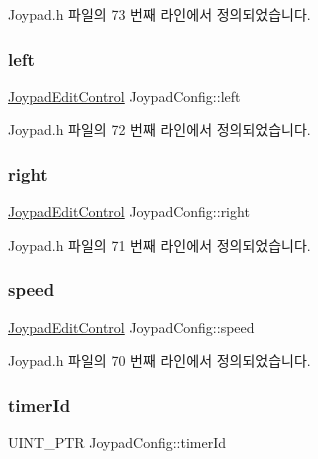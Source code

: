 Joypad.\+h 파일의 73 번째 라인에서 정의되었습니다.

\mbox{\label{class_joypad_config_a99c36e2559ce17f64aa004c37c5f8771}} 
\subsubsection{\texorpdfstring{left}{left}}
{\footnotesize\ttfamily \mbox{\hyperlink{class_joypad_edit_control}{Joypad\+Edit\+Control}} Joypad\+Config\+::left}



Joypad.\+h 파일의 72 번째 라인에서 정의되었습니다.

\mbox{\label{class_joypad_config_ae941e8b6868e423b3c2bf4313c3c340f}} 
\subsubsection{\texorpdfstring{right}{right}}
{\footnotesize\ttfamily \mbox{\hyperlink{class_joypad_edit_control}{Joypad\+Edit\+Control}} Joypad\+Config\+::right}



Joypad.\+h 파일의 71 번째 라인에서 정의되었습니다.

\mbox{\label{class_joypad_config_a57365c2b56d24e6cf20d3586d692583d}} 
\subsubsection{\texorpdfstring{speed}{speed}}
{\footnotesize\ttfamily \mbox{\hyperlink{class_joypad_edit_control}{Joypad\+Edit\+Control}} Joypad\+Config\+::speed}



Joypad.\+h 파일의 70 번째 라인에서 정의되었습니다.

\mbox{\label{class_joypad_config_ae2eb21b8f63e8cf86a5461e78901c3f5}} 
\subsubsection{\texorpdfstring{timer\+Id}{timerId}}
{\footnotesize\ttfamily U\+I\+N\+T\+\_\+\+P\+TR Joypad\+Config\+::timer\+Id\hspace{0.3cm}{\ttfamily [protected]}}




